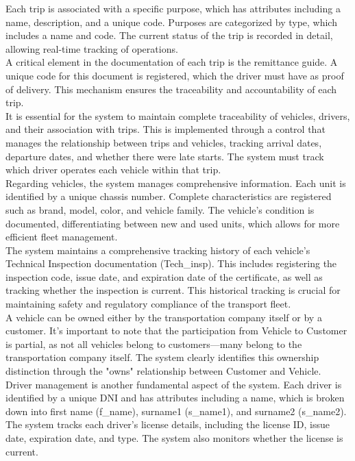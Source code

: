 \documentclass[11pt, a4paper]{article}
\begin{document}
Each trip is associated with a specific purpose, which has attributes including a name, description, and a unique code. Purposes are categorized by type, which includes a 
name and code. The current status of the trip is recorded in detail, allowing real-time tracking of operations. \\

A critical element in the documentation of each trip is the remittance guide. A unique code for this document is registered, which the driver must have as proof of delivery. This mechanism ensures the 
traceability and accountability of each trip. \\

It is essential for the system to maintain complete traceability of vehicles, drivers, and their association with trips. This is implemented through a control that manages the relationship between trips and vehicles, 
tracking arrival dates, departure dates, and whether there were late starts. The system must track which driver operates each vehicle within that trip. \\

Regarding vehicles, the system manages comprehensive information. Each unit is identified by a unique chassis number. Complete characteristics are registered such as brand, model, color, and vehicle family. The vehicle's condition is documented, 
differentiating between new and used units, which allows for more efficient fleet management. \\

The system maintains a comprehensive tracking history of each vehicle's Technical Inspection documentation (Tech\_insp). This includes registering the inspection code, issue date, and expiration date of the certificate, as well as tracking whether the 
inspection is current. This historical tracking is crucial for maintaining safety and regulatory compliance of the transport fleet. \\

A vehicle can be owned either by the transportation company itself or by a customer. It's important to note that the participation from Vehicle to Customer is partial, as not all vehicles belong to customers—many belong to the transportation company itself. 
The system clearly identifies this ownership distinction through the "owns" relationship between Customer and Vehicle. \\

Driver management is another fundamental aspect of the system. Each driver is identified by a unique DNI and has attributes including a name, which is broken down into first name (f\_name), surname1 (s\_name1), and surname2 (s\_name2). The system tracks each driver's license details, 
including the license ID, issue date, expiration date, and type. The system also monitors whether the license is current. \\
\end{document}
